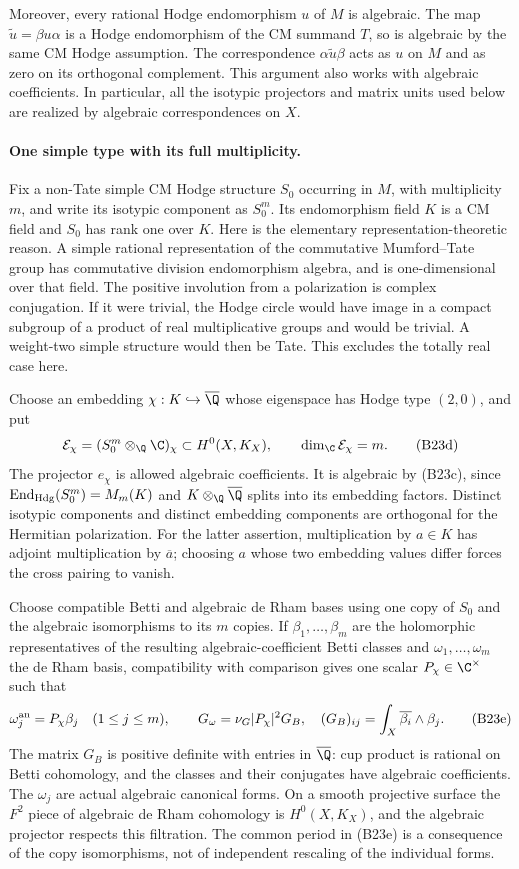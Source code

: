 Moreover, every rational Hodge endomorphism $u$ of $M$ is
algebraic.  The map $\widetilde u=\beta u\alpha$ is a Hodge
endomorphism of the CM summand $T$, so is algebraic by the
same CM Hodge assumption.  The correspondence
$\alpha\widetilde u\beta$ acts as $u$ on $M$ and as zero
on its orthogonal complement.  This argument also works
with algebraic coefficients.  In particular, all the
isotypic projectors and matrix units used below are
realized by algebraic correspondences on $X$.

\paragraph{One simple type with its full multiplicity.}
Fix a non-Tate simple CM Hodge structure $S_0$ occurring in
$M$, with multiplicity $m$, and write its isotypic component
as $S_0^m$.  Its endomorphism field $K$ is a CM field and
$S_0$ has rank one over $K$.  Here is the elementary
representation-theoretic reason.  A simple rational
representation of the commutative Mumford--Tate group has
commutative division endomorphism algebra, and is
one-dimensional over that field.  The positive involution
from a polarization is complex conjugation.  If it were
trivial, the Hodge circle would have image in a compact
subgroup of a product of real multiplicative groups and
would be trivial.  A weight-two simple structure would
then be Tate.  This excludes the totally real case here.

Choose an embedding $\chi:K\hookrightarrow\overline\Q$
whose eigenspace has Hodge type $(2,0)$, and put
\[
 \mathcal E_\chi=(S_0^m\otimes_\Q\C)_\chi
                  \subset H^0(X,K_X),
 \qquad \dim_\C\mathcal E_\chi=m.
 \tag{B23d}
\]
The projector $e_\chi$ is allowed algebraic coefficients.
It is algebraic by (B23c), since
$\operatorname{End}_{\rm Hdg}(S_0^m)=M_m(K)$ and
$K\otimes_\Q\overline\Q$ splits into its embedding factors.
Distinct isotypic components and distinct embedding
components are orthogonal for the Hermitian polarization.
For the latter assertion, multiplication by $a\in K$ has
adjoint multiplication by $\overline a$; choosing $a$ whose
two embedding values differ forces the cross pairing to
vanish.

Choose compatible Betti and algebraic de Rham bases using
one copy of $S_0$ and the algebraic isomorphisms to its $m$
copies.  If $\beta_1,\ldots,\beta_m$ are the holomorphic
representatives of the resulting algebraic-coefficient
Betti classes and $\omega_1,\ldots,\omega_m$ the de Rham
basis, compatibility with comparison gives one scalar
$P_\chi\in\C^\times$ such that
\[
 \omega_j^{\rm an}=P_\chi\beta_j\quad(1\leq j\leq m),
 \qquad
 G_\omega=\nu_G|P_\chi|^2G_B,
 \quad
 (G_B)_{ij}=\int_X\overline{\beta_i}\wedge\beta_j.
 \tag{B23e}
\]
The matrix $G_B$ is positive definite with entries in
$\overline\Q$: cup product is rational on Betti cohomology,
and the classes and their conjugates have algebraic
coefficients.  The $\omega_j$ are actual algebraic
canonical forms.  On a smooth projective surface the
$F^2$ piece of algebraic de Rham cohomology is
$H^0(X,K_X)$, and the algebraic projector respects this
filtration.  The common period in (B23e) is a consequence
of the copy isomorphisms, not of independent rescaling of
the individual forms.

